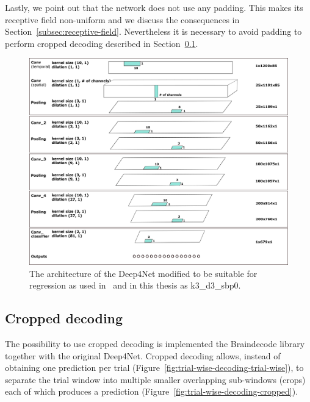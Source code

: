 Lastly, we point out that the network does not use any padding. 
This makes its receptive field non-uniform and we discuss the consequences in Section~\ref{subsec:receptive-field}.
Nevertheless it is necessary to avoid padding to perform cropped decoding described in Section~\ref{subsec:cropped-decoding}.

\begin{figure}[!htbp]
\centering
\includegraphics[width=\linewidth]{img/ch3/architektura.png}
\caption[Deep4Net architecture]{The architecture of the Deep4Net modified to be suitable for regression as used in~\cite{Hammer-2021} and in this thesis as k3\_d3\_sbp0.}
\label{fig:architecture}
\end{figure}

\subsection{Cropped decoding}\label{subsec:cropped-decoding}
The possibility to use cropped decoding is implemented the Braindecode library together with the original Deep4Net.
Cropped decoding allows, instead of obtaining one prediction per trial (Figure~\ref{fig:trial-wise-decoding-trial-wise}), to separate the trial window into multiple smaller overlapping sub-windows (crops) each of which produces a prediction (Figure~\ref{fig:trial-wise-decoding-cropped}).

